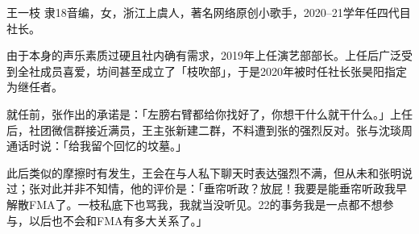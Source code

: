 \begin{section}{王一枝}
	\label{person:王一枝}
	隶18音编，女，浙江上虞人，著名网络原创小歌手，2020--21学年任四代目社长。

	由于本身的声乐素质过硬且社内确有需求，2019年上任演艺部部长。上任后广泛受到全社成员喜爱，坊间甚至成立了「枝吹部」，于是2020年被时任社长张昊阳指定为继任者。
	
	就任前，张作出的承诺是：「左膀右臂都给你找好了，你想干什么就干什么。」上任后，社团微信群接近满员，王主张新建二群，不料遭到张的强烈反对。张与沈琰周通话时说：「给我留个回忆的坟墓。」
	
	此后类似的摩擦时有发生，王会在与人私下聊天时表达强烈不满，但从未和张明说过；张对此并非不知情，他的评价是：「垂帘听政？放屁！我要是能垂帘听政我早解散FMA了。一枝私底下也骂我，我就当没听见。22的事务我是一点都不想参与，以后也不会和FMA有多大关系了。」
\end{section}